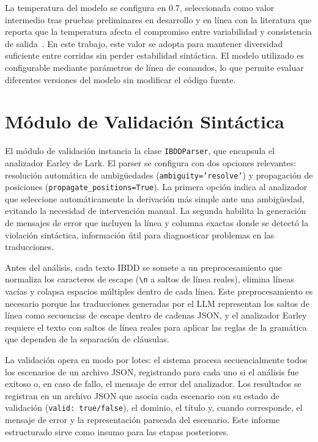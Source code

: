 La temperatura del modelo se configura en $0.7$, seleccionada como valor intermedio tras pruebas preliminares en desarrollo y en línea con la literatura que reporta que la temperatura afecta el compromiso entre variabilidad y consistencia de salida~\cite{holtzman2020degeneration, renze2024temperature}. En este trabajo, este valor se adopta para mantener diversidad suficiente entre corridas sin perder estabilidad sintáctica. El modelo utilizado es configurable mediante parámetros de línea de comandos, lo que permite evaluar diferentes versiones del modelo sin modificar el código fuente.

\section{Módulo de Validación Sintáctica}
\label{sec:modulo-validacion}

El módulo de validación instancia la clase \texttt{IBDDParser}, que encapsula el analizador Earley de Lark. El parser se configura con dos opciones relevantes: resolución automática de ambigüedades (\texttt{ambiguity=\linebreak[0]'resolve'}) y propagación de posiciones (\texttt{propagate\_\linebreak[0]positions=True}). La primera opción indica al analizador que seleccione automáticamente la derivación más simple ante una ambigüedad, evitando la necesidad de intervención manual. La segunda habilita la generación de mensajes de error que incluyen la línea y columna exactas donde se detectó la violación sintáctica, información útil para diagnosticar problemas en las traducciones.

Antes del análisis, cada texto IBDD se somete a un preprocesamiento que normaliza los caracteres de escape (\verb|\n| a saltos de línea reales), elimina líneas vacías y colapsa espacios múltiples dentro de cada línea. Este preprocesamiento es necesario porque las traducciones generadas por el LLM representan los saltos de línea como secuencias de escape dentro de cadenas JSON, y el analizador Earley requiere el texto con saltos de línea reales para aplicar las reglas de la gramática que dependen de la separación de cláusulas.

La validación opera en modo por lotes: el sistema procesa secuencialmente todos los escenarios de un archivo JSON, registrando para cada uno si el análisis fue exitoso o, en caso de fallo, el mensaje de error del analizador. Los resultados se registran en un archivo JSON que asocia cada escenario con su estado de validación (\texttt{valid: true/false}), el dominio, el título y, cuando corresponde, el mensaje de error y la representación parseada del escenario. Este informe estructurado sirve como insumo para las etapas posteriores.

